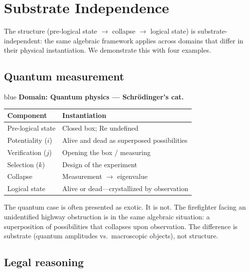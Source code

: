 \documentclass[11pt,a4paper]{article}
\begin{document}
\section{Substrate Independence}
\label{sec:substrate}

The structure (pre-logical state $\to$ collapse $\to$ logical state)
is substrate-independent: the same algebraic framework applies across
domains that differ in their physical instantiation. We demonstrate this
with four examples.

\subsection{Quantum measurement}

\begin{domainbox}{blue}
\textbf{Domain: Quantum physics --- Schr\"odinger's cat.}

\begin{tabularx}{\textwidth}{l Y}
\toprule
\textbf{Component} & \textbf{Instantiation} \\
\midrule
Pre-logical state & Closed box; Re undefined \\
Potentiality ($i$) & Alive and dead as superposed possibilities \\
Verification ($j$) & Opening the box / measuring \\
Selection ($k$) & Design of the experiment \\
Collapse & Measurement $\to$ eigenvalue \\
Logical state & Alive or dead---crystallized by observation \\
\bottomrule
\end{tabularx}

The quantum case is often presented as exotic. It is not. The firefighter
facing an unidentified highway obstruction is in the same algebraic
situation: a superposition of possibilities that collapses upon
observation. The difference is substrate (quantum amplitudes vs.\
macroscopic objects), not structure.
\end{domainbox}

\subsection{Legal reasoning}
\end{document}
